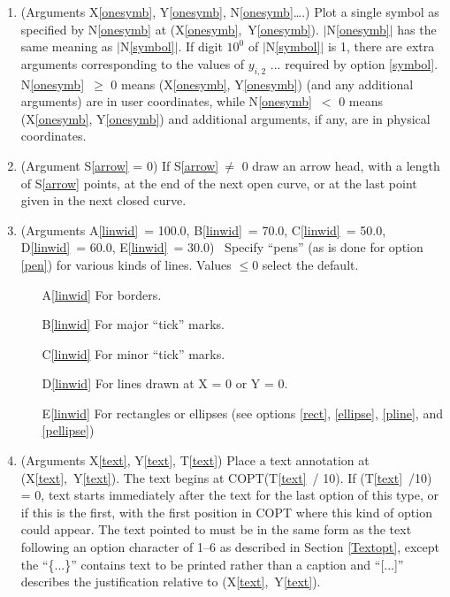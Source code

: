 \documentclass[twoside]{MATH77}
\begin{document}
\begin{multicols}{2}
\begin{enumerate}
\begin{itemize}
        \end{itemize}
\item\label{onesymb} (Arguments X\ref{onesymb}, Y\ref{onesymb},
        N\ref{onesymb}\ldots .)  Plot a single symbol as specified by
        N\ref{onesymb} at (X\ref{onesymb},~Y\ref{onesymb}).
        $|$N\ref{onesymb}$|$ has the same meaning as
        $|$N\ref{symbol}$|$.  If digit $10^0$ of $|$N\ref{symbol}$|$
        is 1, there are extra arguments corresponding to the
        values of $y_{i,2}$ ... required by option \ref{symbol}.
        N\ref{onesymb}~$\geq$ 0 means (X\ref{onesymb}, Y\ref{onesymb})
        (and any additional arguments) are in user coordinates,
        while N\ref{onesymb}~$<$ 0 means (X\ref{onesymb}, Y\ref{onesymb})
        and additional arguments, if any, are in physical coordinates.
\item\label{arrow} (Argument S\ref{arrow} = 0)  If S\ref{arrow}$~\neq$ 0
        draw an arrow head, with a length of S\ref{arrow} points, at
        the end of the next open curve, or at the last point given in
        the next closed curve.
\item\label{linwid} (Arguments A\ref{linwid}~= 100.0, B\ref{linwid}~=
        70.0, C\ref{linwid}~= 50.0, D\ref{linwid}~= 60.0, E\ref{linwid}~=
        30.0) \ Specify ``pens'' (as is done for option \ref{pen}) for
        various kinds of lines. Values $\leq 0$ select the default.
  \begin{itemize}
  \item[A\ref{linwid}] For borders.
  \item[B\ref{linwid}] For major ``tick'' marks.
  \item[C\ref{linwid}] For minor ``tick'' marks.
  \item[D\ref{linwid}] For lines drawn at X = 0  or Y = 0.
  \item[E\ref{linwid}] For rectangles or ellipses (see options \ref{rect},
          \ref{ellipse}, \ref{pline}, and \ref{pellipse})
  \end{itemize}
\item\label{text} (Arguments X\ref{text}, Y\ref{text}, T\ref{text})  Place
        a text annotation at (X\ref{text},~Y\ref{text}).  The text begins at
        COPT(T\ref{text}~/ 10).  If (T\ref{text}~/10) = 0, text starts
        immediately after the text for the last option of this type, or if
        this is the first, with the first position in COPT where this kind of
        option could appear.  The text pointed to must be in the same form
        as the text following an option character of 1--6 as described in
        Section \ref{Textopt}, except the ``\{...\}'' contains text to be
        printed rather than a caption and ``[...]'' describes the
        justification relative to (X\ref{text},~Y\ref{text}).


\end{enumerate}
\end{multicols}
\end{document}
